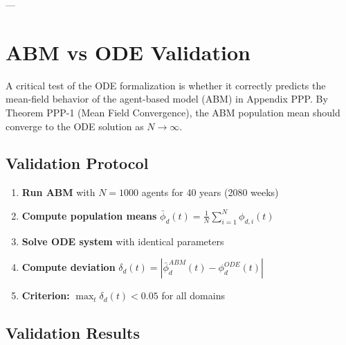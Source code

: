 ---


\section{ABM vs ODE Validation}
\label{ooo:validation}

\begin{tcolorbox}[colback=blue!5!white, colframe=blue!75!black, title=Validation Framework]
A critical test of the ODE formalization is whether it correctly predicts the
mean-field behavior of the agent-based model (ABM) in Appendix PPP.
By Theorem PPP-1 (Mean Field Convergence), the ABM population mean should
converge to the ODE solution as $N \to \infty$.
\end{tcolorbox}

\subsection{Validation Protocol}

\begin{enumerate}
\item \textbf{Run ABM} with $N = 1000$ agents for 40 years (2080 weeks)
\item \textbf{Compute population means} $\bar{\phi}_d(t) = \frac{1}{N}\sum_{i=1}^N \phi_{d,i}(t)$
\item \textbf{Solve ODE system} with identical parameters
\item \textbf{Compute deviation} $\delta_d(t) = |\bar{\phi}_d^{ABM}(t) - \phi_d^{ODE}(t)|$
\item \textbf{Criterion:} $\max_t \delta_d(t) < 0.05$ for all domains
\end{enumerate}

\subsection{Validation Results}

